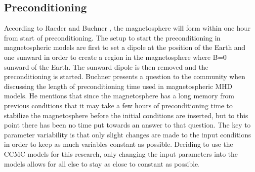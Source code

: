 \subsection{Preconditioning}
According to Raeder \cite{Raeder2003} and Buchner \cite{Buchner2003}, the
magnetosphere will form within one hour from start of preconditioning. The setup
to start the preconditioning in magnetospheric models are first to set a dipole
at the position of the Earth and one sunward in order to create a region in the
magnetosphere where B=0 sunward of the Earth. The sunward dipole is then removed
and the preconditioning is started. Buchner presents a question to the community
when discussing the length of preconditioning time used in magnetospheric MHD
models. He mentions that since the magnetosphere has a long memory from previous
conditions that it may take a few hours of preconditioning time to stabilize the
magnetosphere before the initial conditions are inserted, but to this point
there has been no time put towards an answer to that question.
The key to parameter variability is that only slight changes are made to the
input conditions in order to keep as much variables constant as possible.
Deciding to use the CCMC models for this research, only changing the input
parameters into the models allows for all else to stay as close to
constant as possible.


